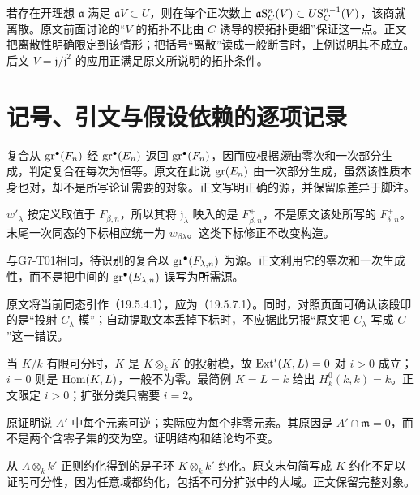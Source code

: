 若存在开理想 $\mathfrak a$ 满足 $\mathfrak a V\subset U$，则在每个正次数上
$\mathfrak a\mathrm S_C^n(V)\subset U\mathrm S_C^{n-1}(V)$，该商就离散。原文前面讨论的“$V$ 的拓扑不比由 $C$ 诱导的模拓扑更细”保证这一点。正文把离散性明确限定到该情形；把括号“离散”读成一般断言时，上例说明其不成立。后文 $V=\mathfrak j/\mathfrak j^2$ 的应用正满足原文所说明的拓扑条件。

\section*{记号、引文与假设依赖的逐项记录}
复合从 $\operatorname{gr}^\bullet(F_n)$ 经 $\operatorname{gr}^\bullet(E_n)$ 返回 $\operatorname{gr}^\bullet(F_n)$，因而应根据\emph{源}由零次和一次部分生成，判定复合在每次为恒等。原文在此说 $\operatorname{gr}(E_n)$ 由一次部分生成，虽然该性质本身也对，却不是所写论证需要的对象。正文写明正确的源，并保留原差异于脚注。

$w'_\lambda$ 按定义取值于 $F_{\beta,n}$，所以其将 $\mathfrak j_\lambda$ 映入的是 $F_{\beta,n}^+$，不是原文该处所写的 $F_{\delta,n}^+$。末尾一次同态的下标相应统一为 $w_{\beta\lambda}$。这类下标修正不改变构造。

与G7-T01相同，待识别的复合以 $\operatorname{gr}^\bullet(F_{\lambda,n})$ 为源。正文利用它的零次和一次生成性，而不是把中间的 $\operatorname{gr}^\bullet(E_{\lambda,n})$ 误写为所需源。

原文将当前同态引作（19.5.4.1），应为（19.5.7.1）。同时，对照页面可确认该段印的是“投射 $C_\lambda$-模”；自动提取文本丢掉下标时，不应据此另报“原文把 $C_\lambda$ 写成 $C$”这一错误。

当 $K/k$ 有限可分时，$K$ 是 $K\otimes_kK$ 的投射模，故 $\operatorname{Ext}^i(K,L)=0$ 对 $i>0$ 成立；$i=0$ 则是 $\operatorname{Hom}(K,L)$，一般不为零。最简例 $K=L=k$ 给出 $H_k^0(k,k)=k$。正文限定 $i>0$；扩张分类只需要 $i=2$。

原证明说 $A'$ 中每个元素可逆；实际应为每个非零元素。其原因是 $A'\cap\mathfrak m=0$，而不是两个含零子集的交为空。证明结构和结论均不变。

从 $A\otimes_kk'$ 正则约化得到的是子环 $K\otimes_kk'$ 约化。原文末句简写成 $K$ 约化不足以证明可分性，因为任意域都约化，包括不可分扩张中的大域。正文保留完整对象。

